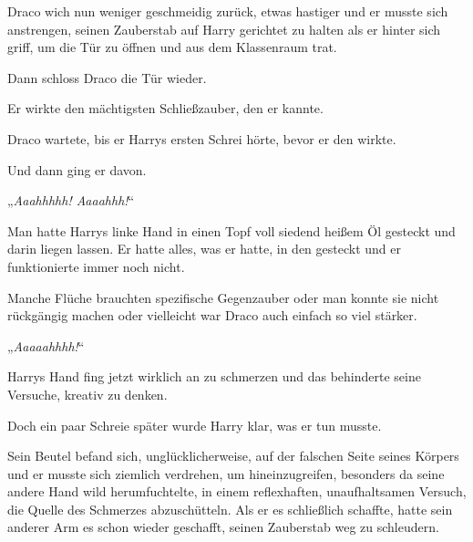 Draco wich nun weniger geschmeidig zurück, etwas hastiger und er musste sich anstrengen, seinen Zauberstab auf Harry gerichtet zu halten als er hinter sich griff, um die Tür zu öffnen und aus dem Klassenraum trat.

Dann schloss Draco die Tür wieder.

Er wirkte den mächtigsten Schließzauber, den er kannte.

Draco wartete, bis er Harrys ersten Schrei hörte, bevor er den  wirkte.

Und dann ging er davon.

\later

„\emph{Aaahhhhh!  Aaaahhh!}“

Man hatte Harrys linke Hand in einen Topf voll siedend heißem Öl gesteckt und darin liegen lassen. Er hatte alles, was er hatte, in den  gesteckt und er funktionierte immer noch nicht.

Manche Flüche brauchten spezifische Gegenzauber oder man konnte sie nicht rückgängig machen oder vielleicht war Draco auch einfach so viel stärker.

„\emph{Aaaaahhhh!}“

Harrys Hand fing jetzt wirklich an zu schmerzen und das behinderte seine Versuche, kreativ zu denken.

Doch ein paar Schreie später wurde Harry klar, was er tun musste.

Sein Beutel befand sich, unglücklicherweise, auf der falschen Seite seines Körpers und er musste sich ziemlich verdrehen, um hineinzugreifen, besonders da seine andere Hand wild herumfuchtelte, in einem reflexhaften, unaufhaltsamen Versuch, die Quelle des Schmerzes abzuschütteln. Als er es schließlich schaffte, hatte sein anderer Arm es schon wieder geschafft, seinen Zauberstab weg zu schleudern.

